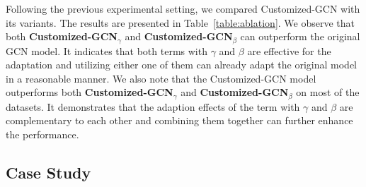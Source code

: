\documentclass[11pt,dvipdfm]{article}
\begin{document}
Following the previous experimental setting, we compared Customized-GCN with its variants.
The results are presented in Table~\ref{table:ablation}. We observe that both \textbf{Customized-GCN$_{\gamma}$} and \textbf{Customized-GCN$_{\beta}$} can outperform the original GCN model. It indicates that both terms with $\gamma$ and $\beta$ are effective for the adaptation and utilizing either one of them can already adapt the original model in a reasonable manner. We also note that the Customized-GCN model outperforms both \textbf{Customized-GCN$_{\gamma}$} and \textbf{Customized-GCN$_{\beta}$} on most of the datasets. It demonstrates that the adaption effects of the term with $\gamma$ and $\beta$ are complementary to each other and combining them together can further enhance the performance. 



\subsection{Case Study}
\end{document}
